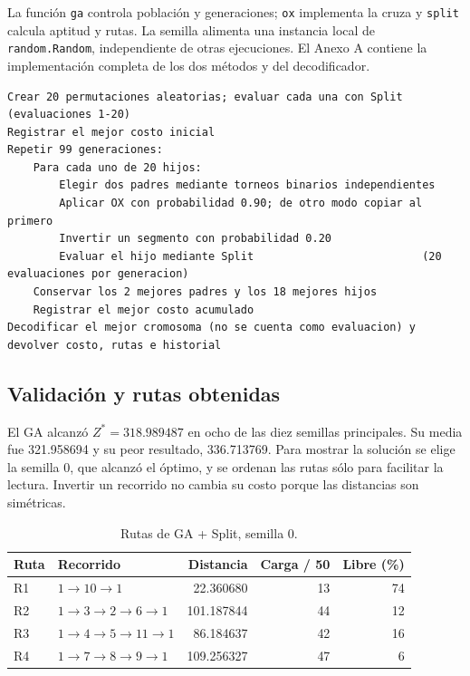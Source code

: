 \documentclass[11pt,a4paper]{article}
\numberwithin{equation}{section}
\begin{document}
La función \texttt{ga} controla población y generaciones; \texttt{ox} implementa la cruza y \texttt{split} calcula aptitud y rutas. La semilla alimenta una instancia local de \texttt{random.Random}, independiente de otras ejecuciones. El Anexo A contiene la implementación completa de los dos métodos y del decodificador.

\begin{lstlisting}[caption={Pseudocódigo del algoritmo genético.}]
Crear 20 permutaciones aleatorias; evaluar cada una con Split   (evaluaciones 1-20)
Registrar el mejor costo inicial
Repetir 99 generaciones:
    Para cada uno de 20 hijos:
        Elegir dos padres mediante torneos binarios independientes
        Aplicar OX con probabilidad 0.90; de otro modo copiar al primero
        Invertir un segmento con probabilidad 0.20
        Evaluar el hijo mediante Split                          (20 evaluaciones por generacion)
    Conservar los 2 mejores padres y los 18 mejores hijos
    Registrar el mejor costo acumulado
Decodificar el mejor cromosoma (no se cuenta como evaluacion) y devolver costo, rutas e historial
\end{lstlisting}

\subsection{Validación y rutas obtenidas}

El GA alcanzó \(Z^*=318.989487\) en ocho de las diez semillas principales. Su media fue 321.958694 y su peor resultado, 336.713769. Para mostrar la solución se elige la semilla 0, que alcanzó el óptimo, y se ordenan las rutas sólo para facilitar la lectura. Invertir un recorrido no cambia su costo porque las distancias son simétricas.

\begin{table}[H]\centering\small
\caption{Rutas de GA + Split, semilla 0.}\label{tab:rutasga}
\begin{tabular}{llrrr}\toprule
Ruta & Recorrido & Distancia & Carga / 50 & Libre (\%)\\\midrule
R1 & \(1\to10\to1\) & 22.360680 & 13 & 74\\
R2 & \(1\to3\to2\to6\to1\) & 101.187844 & 44 & 12\\
R3 & \(1\to4\to5\to11\to1\) & 86.184637 & 42 & 16\\
R4 & \(1\to7\to8\to9\to1\) & 109.256327 & 47 & 6\\\bottomrule
\end{tabular}
\end{table}
\end{document}
